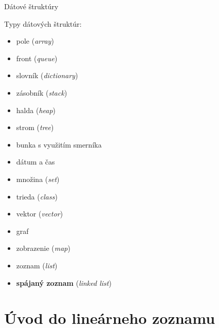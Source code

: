 \documentclass[slovak, 11pt]{beamer}
\begin{document}
\begin{frame}{Dátové štruktúry}
    \begin{minipage}{0.46\textwidth}
    \begin{block}{Typy dátových štruktúr:}
        \begin{itemize}
            \item pole (\emph{array})
            \item front (\emph{queue})
            \item slovník (\emph{dictionary})
            \item zásobník (\emph{stack})
            \item halda (\emph{heap})
            \item strom (\emph{tree})
            \item bunka s využitím smerníka
        \end{itemize}
    \end{block}
    \end{minipage}
    \hspace{0.5cm}
    \begin{minipage}{0.46\textwidth}
    \begin{block}{}
        \begin{itemize}
            \item dátum a čas
            \item množina (\emph{set})
            \item trieda (\emph{class})
            \item vektor (\emph{vector})
            \item graf
            \item zobrazenie (\emph{map})
            \item zoznam (\emph{list})
            \item \textbf{spájaný zoznam} (\emph{linked list})
        \end{itemize}
    \end{block}
    \end{minipage}
\end{frame}



\section{Úvod do lineárneho zoznamu}
\end{document}
